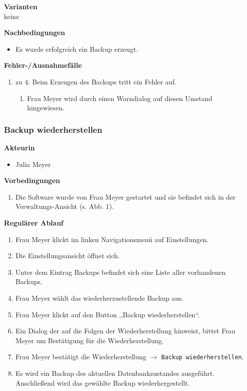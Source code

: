 \documentclass[fontsize=12pt,paper=a4,twoside]{scrartcl}
\begin{document}
\textbf{Varianten}\\
keine
\vspace{5pt}

\textbf{Nachbedingungen}
\begin{itemize}
\item Es wurde erfolgreich ein Backup erzeugt.
\end{itemize}
\vspace{5pt}

\textbf{Fehler-/Ausnahmefälle}\\
\begin{enumerate}
\item zu 4: Beim Erzeugen des Backups tritt ein Fehler auf.
	\begin{enumerate}[label=\arabic*.]
	\item Frau Meyer wird durch einen Warndialog auf diesen Umstand hingewiesen.
	\end{enumerate}
\end{enumerate}

\subsubsection{Backup wiederherstellen}
\textbf{Akteurin}
\begin{itemize}
\item Julia Meyer
\end{itemize}
\vspace{5pt}

\textbf{Vorbedingungen}
\begin{enumerate}
\item Die Software wurde von Frau Meyer gestartet und sie befindet sich in der Verwaltungs-Ansicht (s. Abb. 1).
\end{enumerate}
\vspace{5pt}

\textbf{Regulärer Ablauf}
\begin{enumerate}
\item Frau Meyer klickt im linken Navigationsmenü auf Einstellungen.
\item Die Einstellungsansicht öffnet sich. 
\item Unter dem Eintrag Backups befindet sich eine Liste aller vorhandenen Backups.
\item Frau Meyer wählt das wiederherzustellende Backup aus.
\item Frau Meyer klickt auf den Button ,,Backup wiederherstellen``.
\item Ein Dialog der auf die Folgen der Wiederherstellung hinweist, bittet Frau Meyer um Bestätigung für die Wiederherstellung.
\item Frau Meyer bestätigt die Wiederherstellung $\rightarrow$ \texttt{Backup wiederherstellen}.
\item Es wird ein Backup des aktuellen Datenbankzustandes ausgeführt. Anschließend wird das gewählte Backup wiederhergestellt.
\end{enumerate}
\vspace{5pt}
\end{document}
